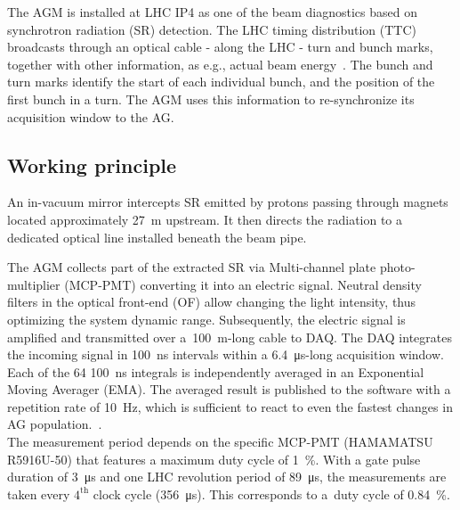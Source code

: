 %
The AGM is installed at LHC IP4 as one of the beam diagnostics based on synchrotron radiation (SR) detection. %
%
The LHC timing distribution (TTC) broadcasts through an optical cable - along the LHC - turn and bunch marks, together with other information, as e.g., actual beam energy~\cite{ttc_distribution}.
%
The bunch and turn marks identify the start of each individual bunch, and the position of the first bunch in a turn.   
%
The AGM uses this information to re-synchronize its acquisition window to the AG.
%
\subsection{Working principle}
%
An in-vacuum mirror intercepts  SR  emitted by protons passing through magnets located approximately \SI{27}{m} upstream. It then directs the radiation to a dedicated optical line installed beneath the beam pipe.

%
The AGM collects part of the extracted SR via Multi-channel plate photo-multiplier (MCP-PMT) converting it into an electric signal.
%
Neutral density filters in the optical front-end (OF) allow  changing the light intensity, thus optimizing the system dynamic range.
% 
Subsequently, the electric signal is amplified and transmitted over a~\SI{100}{m}-long cable to DAQ.
%
The DAQ integrates the incoming signal in \SI{100}{\nano\second} intervals within a \SI{6.4}{\micro\second}-long acquisition window.
%
Each of the 64 \SI{100}{\nano\second} integrals is independently averaged in an Exponential Moving Averager (EMA).
%
The averaged result is published to the software with a repetition rate of \SI{10}{Hz}, which is sufficient to react to even the fastest changes in AG population.~\cite{high_sensitivity_measurement}.
%
\\
The measurement period depends on the specific MCP-PMT (HAMAMATSU R5916U-50) that features a maximum duty cycle of \SI{1}{\%}. 
%
%
%
With a gate pulse duration of \SI{3}{\micro\second} and one LHC revolution period of \SI{89}{\micro\second}, the measurements are taken every $4^{\text{th}}$ clock cycle (\SI{356}{\micro\second}).
%
This corresponds to a~duty cycle of \SI{0.84}{\%}.
\\
%

